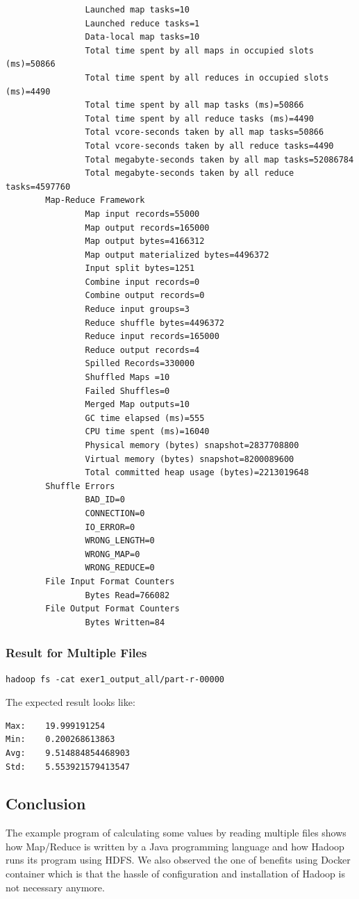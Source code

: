 \begin{lstlisting}
                Launched map tasks=10
                Launched reduce tasks=1
                Data-local map tasks=10
                Total time spent by all maps in occupied slots (ms)=50866
                Total time spent by all reduces in occupied slots (ms)=4490
                Total time spent by all map tasks (ms)=50866
                Total time spent by all reduce tasks (ms)=4490
                Total vcore-seconds taken by all map tasks=50866
                Total vcore-seconds taken by all reduce tasks=4490
                Total megabyte-seconds taken by all map tasks=52086784
                Total megabyte-seconds taken by all reduce tasks=4597760
        Map-Reduce Framework
                Map input records=55000
                Map output records=165000
                Map output bytes=4166312
                Map output materialized bytes=4496372
                Input split bytes=1251
                Combine input records=0
                Combine output records=0
                Reduce input groups=3
                Reduce shuffle bytes=4496372
                Reduce input records=165000
                Reduce output records=4
                Spilled Records=330000
                Shuffled Maps =10
                Failed Shuffles=0
                Merged Map outputs=10
                GC time elapsed (ms)=555
                CPU time spent (ms)=16040
                Physical memory (bytes) snapshot=2837708800
                Virtual memory (bytes) snapshot=8200089600
                Total committed heap usage (bytes)=2213019648
        Shuffle Errors
                BAD_ID=0
                CONNECTION=0
                IO_ERROR=0
                WRONG_LENGTH=0
                WRONG_MAP=0
                WRONG_REDUCE=0
        File Input Format Counters
                Bytes Read=766082
        File Output Format Counters
                Bytes Written=84
\end{lstlisting}


\subsubsection{Result for Multiple Files}

\begin{lstlisting}
hadoop fs -cat exer1_output_all/part-r-00000
\end{lstlisting}

The expected result looks like:

\begin{lstlisting}
Max:    19.999191254
Min:    0.200268613863
Avg:    9.514884854468903
Std:    5.553921579413547
\end{lstlisting}

\subsection{Conclusion}

The example program of calculating some values by reading multiple
files shows how Map/Reduce is written by a Java programming language
and how Hadoop runs its program using HDFS. We also observed the one
of benefits using Docker container which is that the hassle of
configuration and installation of Hadoop is not necessary anymore.


